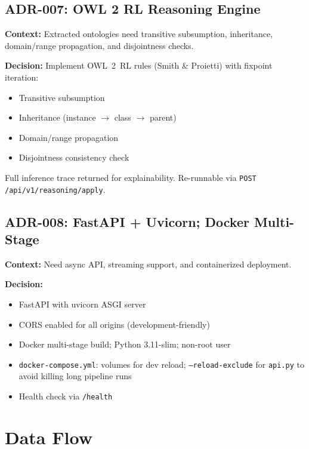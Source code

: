 \documentclass[11pt,a4paper]{article}
\begin{document}
\subsection{ADR-007: OWL 2 RL Reasoning Engine}
\label{sec:adr-reasoning}

\textbf{Context:} Extracted ontologies need transitive subsumption, inheritance, domain/range propagation, and disjointness checks.

\textbf{Decision:} Implement OWL~2~RL rules (Smith \& Proietti) with fixpoint iteration:
\begin{itemize}
    \item Transitive subsumption
    \item Inheritance (instance $\rightarrow$ class $\rightarrow$ parent)
    \item Domain/range propagation
    \item Disjointness consistency check
\end{itemize}

Full inference trace returned for explainability. Re-runnable via \texttt{POST /api/v1/reasoning/apply}.

\subsection{ADR-008: FastAPI + Uvicorn; Docker Multi-Stage}
\label{sec:adr-deployment}

\textbf{Context:} Need async API, streaming support, and containerized deployment.

\textbf{Decision:}
\begin{itemize}
    \item FastAPI with uvicorn ASGI server
    \item CORS enabled for all origins (development-friendly)
    \item Docker multi-stage build; Python 3.11-slim; non-root user
    \item \texttt{docker-compose.yml}: volumes for dev reload; \texttt{--reload-exclude} for \texttt{api.py} to avoid killing long pipeline runs
    \item Health check via \texttt{/health}
\end{itemize}

\section{Data Flow}
\end{document}
